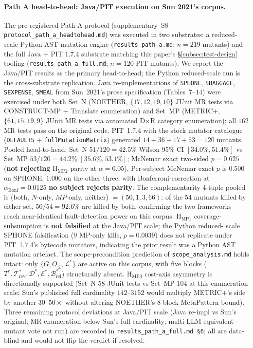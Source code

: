 \documentclass[acmsmall, screen]{acmart}
\begin{document}
\paragraph{Path A head-to-head: Java/PIT execution on Sun 2021's corpus.}
\label{para:path-a-results}
The pre-registered Path A protocol (supplementary~S8
\texttt{protocol\_path\_a\_headtohead.md}) was executed in two
substrates: a reduced-scale Python AST mutation engine
(\texttt{results\_path\_a.md}; $n = 219$ mutants) and the full
Java + PIT 1.7.4 substrate matching this paper's
\S\ref{subsec:test-design} tooling
(\texttt{results\_path\_a\_full.md}; $n = 120$ PIT mutants). We
report the Java/PIT results as the primary head-to-head; the Python
reduced-scale run is the cross-substrate replication. Java
re-implementations of \texttt{SPHONE}, \texttt{SBAGGAGE},
\texttt{SEXPENSE}, \texttt{SMEAL} from Sun~2021's prose
specification (Tables~7--14) were exercised under both Set~N
(NOETHER, $\{17, 12, 19, 10\}$ JUnit MR tests via CONSTRUCT-MP +
Translate enumeration) and Set~MP (METRIC$+$, $\{61, 15, 19, 9\}$
JUnit MR tests via automated D$\times$R category enumeration); all
$162$ MR tests pass on the original code. PIT~1.7.4 with the stock
mutator catalogue (\texttt{DEFAULTS} + \texttt{fullMutationMatrix})
generated $14 + 36 + 17 + 53 = 120$ mutants. Pooled head-to-head:
Set~N $51/120 = 42.5\%$ Wilson 95\% CI $[34.0\%, 51.4\%]$ vs Set~MP
$53/120 = 44.2\%$ $[35.6\%, 53.1\%]$; McNemar exact two-sided
$p = 0.625$ (\textbf{not rejecting} H$_{\mathrm{MP2}}$ parity at
$\alpha = 0.05$). Per-subject McNemar exact $p$ is $0.500$ on
SPHONE, $1.000$ on the other three; with Bonferroni-correction at
$\alpha_{\mathrm{Bonf}} = 0.0125$ \textbf{no subject rejects parity}.
The complementarity 4-tuple pooled is
(both, $N$-only, $MP$-only, neither) $= (50, 1, 3, 66)$: of the $54$
mutants killed by either set, $50/54 = 92.6\%$ are killed by both,
confirming the two frameworks reach near-identical fault-detection
power on this corpus. H$_{\mathrm{MP1}}$ coverage-subsumption is
\textbf{not falsified} at the Java/PIT scale; the Python reduced-
scale SPHONE falsification ($9$ MP-only kills, $p = 0.0039$) does
not replicate under PIT~1.7.4's bytecode mutators, indicating the
prior result was a Python AST mutation artefact. The
scope-precondition prediction of \texttt{scope\_analysis.md}
holds intact: only $\{G, O_{\le}, \mathcal{L}^{*}\}$ are active on
this corpus, with five blocks ($T^{*}, \mathcal{T}^{*}_{\mathrm{rev}},
\mathcal{D}^{*}, \mathcal{E}^{*}, \mathcal{B}^{*}_{\mathrm{rel}}$)
structurally absent. H$_{\mathrm{MP3}}$ cost-axis asymmetry is
directionally supported (Set~N $58$ JUnit tests vs Set~MP $104$ at
this enumeration scale; Sun's published full cardinality
$142$--$3152$ would multiply METRIC$+$'s side by another $30$--$50\times$
without altering NOETHER's $8$-block MetaPattern bound). Three
remaining protocol deviations at Java/PIT scale (Java re-impl vs
Sun's original; MR enumeration below Sun's full cardinality;
multi-LLM equivalent-mutant vote not run) are recorded in
\texttt{results\_path\_a\_full.md~\S 6}; all are data-blind and
would not flip the verdict if resolved.
\end{document}
